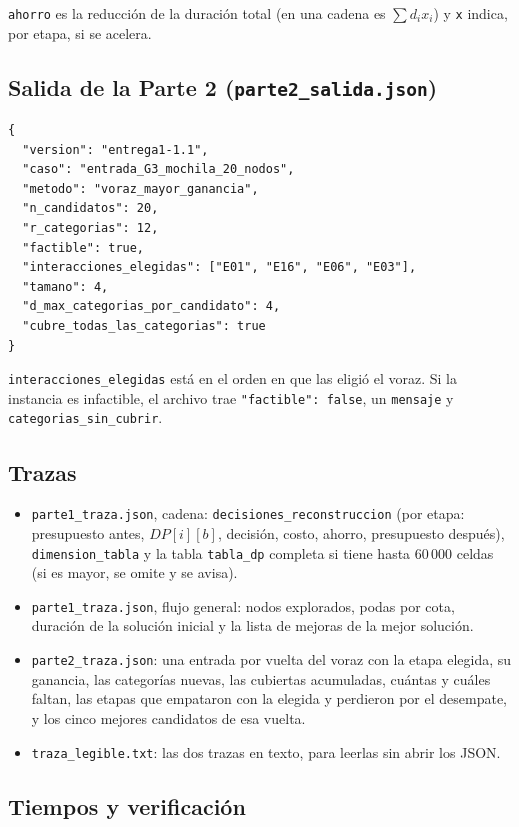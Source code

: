 \documentclass[11pt,a4paper]{article}
\begin{document}
\texttt{ahorro} es la reducción de la duración total (en una cadena es $\sum d_ix_i$) y \texttt{x} indica, por etapa, si se acelera.

\subsection{Salida de la Parte 2 (\texttt{parte2\_salida.json})}

\begin{Verbatim}
{
  "version": "entrega1-1.1",
  "caso": "entrada_G3_mochila_20_nodos",
  "metodo": "voraz_mayor_ganancia",
  "n_candidatos": 20,
  "r_categorias": 12,
  "factible": true,
  "interacciones_elegidas": ["E01", "E16", "E06", "E03"],
  "tamano": 4,
  "d_max_categorias_por_candidato": 4,
  "cubre_todas_las_categorias": true
}
\end{Verbatim}

\texttt{interacciones\_elegidas} está en el orden en que las eligió el voraz. Si la instancia es infactible, el archivo trae \texttt{"factible": false}, un \texttt{mensaje} y \texttt{categorias\_sin\_cubrir}.

\subsection{Trazas}

\begin{itemize}[nosep]
  \item \texttt{parte1\_traza.json}, cadena: \texttt{decisiones\_reconstruccion} (por etapa: presupuesto antes, $DP[i][b]$, decisión, costo, ahorro, presupuesto después), \texttt{dimension\_tabla} y la tabla \texttt{tabla\_dp} completa si tiene hasta 60\,000 celdas (si es mayor, se omite y se avisa).
  \item \texttt{parte1\_traza.json}, flujo general: nodos explorados, podas por cota, duración de la solución inicial y la lista de mejoras de la mejor solución.
  \item \texttt{parte2\_traza.json}: una entrada por vuelta del voraz con la etapa elegida, su ganancia, las categorías nuevas, las cubiertas acumuladas, cuántas y cuáles faltan, las etapas que empataron con la elegida y perdieron por el desempate, y los cinco mejores candidatos de esa vuelta.
  \item \texttt{traza\_legible.txt}: las dos trazas en texto, para leerlas sin abrir los JSON.
\end{itemize}

\subsection{Tiempos y verificación}
\end{document}
